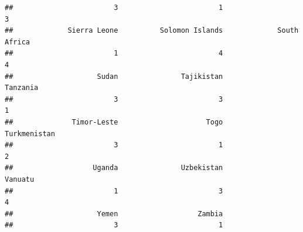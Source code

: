 \documentclass[
]{article}
\newenvironment{Shaded}{}{}
\newcommand{\AttributeTok}[1]{#1}
\newcommand{\DecValTok}[1]{#1}
\newcommand{\FunctionTok}[1]{#1}
\newcommand{\NormalTok}[1]{#1}
\newcommand{\OtherTok}[1]{\textcolor[rgb]{1.00,0.25,0.00}{#1}}
\newcommand{\SpecialCharTok}[1]{\textcolor[rgb]{0.00,0.50,0.50}{#1}}
\begin{document}
\begin{verbatim}
##                        3                        1                        3 
##             Sierra Leone          Solomon Islands             South Africa 
##                        1                        4                        4 
##                    Sudan               Tajikistan                 Tanzania 
##                        3                        3                        1 
##              Timor-Leste                     Togo             Turkmenistan 
##                        3                        1                        2 
##                   Uganda               Uzbekistan                  Vanuatu 
##                        1                        3                        4 
##                    Yemen                   Zambia 
##                        3                        1
\end{verbatim}

\begin{Shaded}
\end{Shaded}
\end{document}
